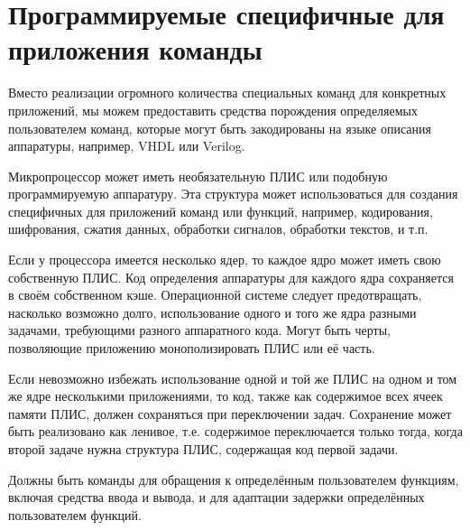 \documentclass[forwardcom.tex]{subfiles}
\begin{document}
\chapter{Программируемые специфичные для приложения команды}
Вместо реализации огромного количества специальных команд для конкретных приложений, мы можем предоставить средства порождения определяемых пользователем команд, которые могут быть закодированы на языке описания аппаратуры, например, VHDL или Verilog. 

Микропроцессор может иметь необязательную ПЛИС или подобную программируемую аппаратуру. Эта структура может использоваться для создания специфичных для приложений команд или функций, например, кодирования, шифрования, сжатия данных, обработки сигналов, обработки текстов, и т.п.

Если у процессора имеется несколько ядер, то каждое ядро может иметь свою собственную ПЛИС. Код определения аппаратуры для каждого ядра сохраняется в своём собственном кэше. Операционной системе следует предотвращать, насколько возможно долго, использование одного и того же ядра разными задачами, требующими разного аппаратного кода. Могут быть черты, позволяющие приложению монополизировать ПЛИС или её часть.

Если невозможно избежать использование одной и той же ПЛИС на одном и том же ядре несколькими приложениями, то код, также как содержимое всех ячеек памяти ПЛИС, должен сохраняться при переключении задач. Сохранение может быть реализовано как ленивое, т.е. содержимое переключается только тогда, когда второй задаче нужна структура ПЛИС, содержащая код первой задачи.

Должны быть команды для обращения к определённым пользователем функциям, включая средства ввода и вывода, и для адаптации задержки определённых пользователем функций.
\end{document}

